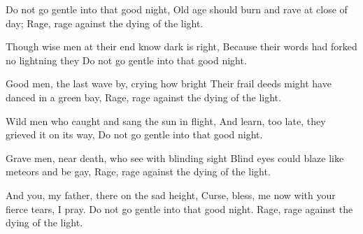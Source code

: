 \documentclass[fontsize=9, a5paper]{scrbook}
\newcommand\blankpage{%
    \null
    \thispagestyle{empty}%
    \addtocounter{page}{-1}%
    \newpage}
\begin{document}
\pagebreak

\afterpage{\blankpage}
\begin{poem}
	\begin{stanza}
		Do not go gentle into that good night,\verseline
		Old age should burn and rave at close of day;\verseline
		Rage, rage against the dying of the light.
	\end{stanza}
	
	\begin{stanza}
		Though wise men at their end know dark is right,\verseline
		Because their words had forked no lightning they\verseline
		Do not go gentle into that good night.
	\end{stanza}
	
	\begin{stanza}
		Good men, the last wave by, crying how bright\verseline
		Their frail deeds might have danced in a green bay,\verseline
		Rage, rage against the dying of the light.
	\end{stanza}
	
	\begin{stanza}
		Wild men who caught and sang the sun in flight,\verseline
		And learn, too late, they grieved it on its way,\verseline
		Do not go gentle into that good night.
	\end{stanza}
	
	\begin{stanza}
		Grave men, near death, who see with blinding sight\verseline
		Blind eyes could blaze like meteors and be gay,\verseline
		Rage, rage against the dying of the light.
	\end{stanza}
	
	\begin{stanza}
		And you, my father, there on the sad height,\verseline
		Curse, bless, me now with your fierce tears, I pray.\verseline
		Do not go gentle into that good night.\verseline
		Rage, rage against the dying of the light.
	\end{stanza}
\end{poem}

\pagebreak
\end{document}
